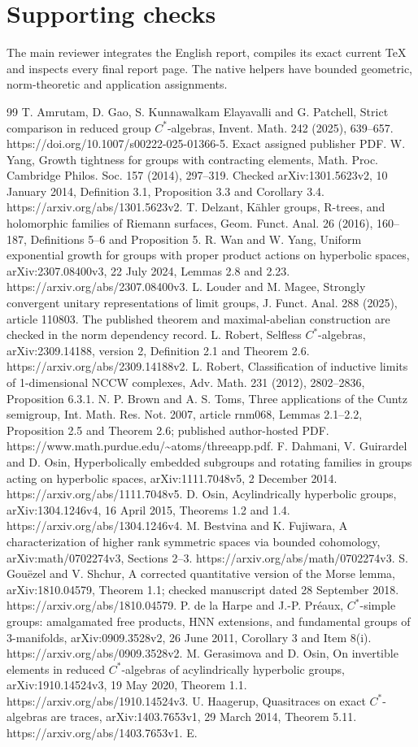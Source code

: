 \documentclass[10pt]{article}
\begin{document}
\section*{Supporting checks}
The main reviewer integrates the English report, compiles its exact current TeX and inspects every final report page. The native helpers have bounded geometric, norm-theoretic and application assignments.\par
99 T. Amrutam, D. Gao, S. Kunnawalkam Elayavalli and G. Patchell, Strict comparison in reduced group \(C^*\)-algebras, Invent. Math. 242 (2025), 639–657. https://doi.org/10.1007/s00222-025-01366-5. Exact assigned publisher PDF. W. Yang, Growth tightness for groups with contracting elements, Math. Proc. Cambridge Philos. Soc. 157 (2014), 297–319. Checked arXiv:1301.5623v2, 10 January 2014, Definition 3.1, Proposition 3.3 and Corollary 3.4. https://arxiv.org/abs/1301.5623v2. T. Delzant, Kähler groups, R-trees, and holomorphic families of Riemann surfaces, Geom. Funct. Anal. 26 (2016), 160–187, Definitions 5–6 and Proposition 5. R. Wan and W. Yang, Uniform exponential growth for groups with proper product actions on hyperbolic spaces, arXiv:2307.08400v3, 22 July 2024, Lemmas 2.8 and 2.23. https://arxiv.org/abs/2307.08400v3. L. Louder and M. Magee, Strongly convergent unitary representations of limit groups, J. Funct. Anal. 288 (2025), article 110803. The published theorem and maximal-abelian construction are checked in the norm dependency record. L. Robert, Selfless \(C^*\)-algebras, arXiv:2309.14188, version 2, Definition 2.1 and Theorem 2.6. https://arxiv.org/abs/2309.14188v2. L. Robert, Classification of inductive limits of 1-dimensional NCCW complexes, Adv. Math. 231 (2012), 2802–2836, Proposition 6.3.1. N. P. Brown and A. S. Toms, Three applications of the Cuntz semigroup, Int. Math. Res. Not. 2007, article rnm068, Lemmas 2.1–2.2, Proposition 2.5 and Theorem 2.6; published author-hosted PDF. https://www.math.purdue.edu/\textasciitilde{}atoms/threeapp.pdf. F. Dahmani, V. Guirardel and D. Osin, Hyperbolically embedded subgroups and rotating families in groups acting on hyperbolic spaces, arXiv:1111.7048v5, 2 December 2014. https://arxiv.org/abs/1111.7048v5. D. Osin, Acylindrically hyperbolic groups, arXiv:1304.1246v4, 16 April 2015, Theorems 1.2 and 1.4. https://arxiv.org/abs/1304.1246v4. M. Bestvina and K. Fujiwara, A characterization of higher rank symmetric spaces via bounded cohomology, arXiv:math/0702274v3, Sections 2–3. https://arxiv.org/abs/math/0702274v3. S. Gouëzel and V. Shchur, A corrected quantitative version of the Morse lemma, arXiv:1810.04579, Theorem 1.1; checked manuscript dated 28 September 2018. https://arxiv.org/abs/1810.04579. P. de la Harpe and J.-P. Préaux, \(C^*\)-simple groups: amalgamated free products, HNN extensions, and fundamental groups of 3-manifolds, arXiv:0909.3528v2, 26 June 2011, Corollary 3 and Item 8(i). https://arxiv.org/abs/0909.3528v2. M. Gerasimova and D. Osin, On invertible elements in reduced \(C^*\)-algebras of acylindrically hyperbolic groups, arXiv:1910.14524v3, 19 May 2020, Theorem 1.1. https://arxiv.org/abs/1910.14524v3. U. Haagerup, Quasitraces on exact \(C^*\)-algebras are traces, arXiv:1403.7653v1, 29 March 2014, Theorem 5.11. https://arxiv.org/abs/1403.7653v1. E. 
\end{document}

